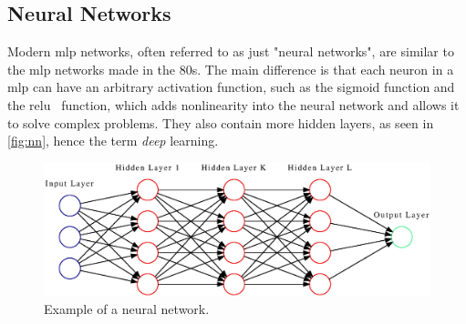 \subsection{Neural Networks}
Modern \gls*{mlp} networks, often referred to as just "neural networks", are similar to the \gls*{mlp} networks made in the 80s. The main difference is that each neuron in a \gls*{mlp} can have an arbitrary activation function, such as the sigmoid function and the \gls*{relu}~\cite{relu} function, which adds nonlinearity into the neural network and allows it to solve complex problems. They also contain more hidden layers, as seen in \autoref{fig:nn}, hence the term \emph{deep} learning.
\begin{figure}[htb]
    \centering
    \includegraphics[width=\linewidth]{resources/related_works/nn.gv.eps}
    \caption[Neural Network Example]{Example of a neural network.}
    \label{fig:nn}
\end{figure}
\par
